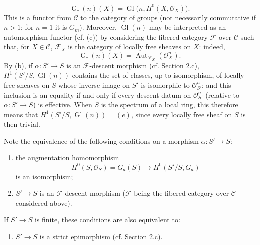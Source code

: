 \[
  \operatorname{Gl}(n)(X)=
  \operatorname{Gl}\bigl(n,H^0(X,\mathcal O_X)\bigr).
\]
This is a functor from $\mathcal C$ to the category of groups (not necessarily
commutative if $n>1$; for $n=1$ it is $G_m$). Moreover,
$\operatorname{Gl}(n)$ may be interpreted as an automorphism functor (cf. (c))
by considering the fibered category $\mathcal F$ over $\mathcal C$ such that,
for $X\in\mathcal C$, $\mathcal F_X$ is the category of locally free sheaves on
$X$: indeed,
\[
  \operatorname{Gl}(n)(X)=
  \operatorname{Aut}_{\mathcal F_X}(\mathcal O_X^n).
\]
By (b), if $\alpha:S'\longrightarrow S$ is an
$\mathcal F$-descent morphism (cf. Section 2.c),
$H^1(S'/S,\operatorname{Gl}(n))$ contains the set of classes, up to
isomorphism, of locally free sheaves on $S$ whose inverse image on $S'$ is
isomorphic to $\mathcal O_{S'}^n$; and this inclusion is an equality if and
only if every descent datum on $\mathcal O_{S'}^n$ (relative to
$\alpha:S'\longrightarrow S$) is effective. When $S$ is the spectrum of a
local ring, this therefore means that
$H^1(S'/S,\operatorname{Gl}(n))=(e)$, since every locally free sheaf on $S$ is
then trivial.

Note the equivalence of the following conditions on a morphism
$\alpha:S'\longrightarrow S$:
\begin{enumerate}
\item[(i)] the augmentation homomorphism
\[
  H^0(S,\mathcal O_S)=G_a(S)\longrightarrow H^0(S'/S,G_a)
\]
is an isomorphism;
\item[(ii)] $S'\longrightarrow S$ is an $\mathcal F$-descent morphism
($\mathcal F$ being the fibered category over $\mathcal C$ considered above).
\end{enumerate}
If $S'\longrightarrow S$ is finite, these conditions are also equivalent to:
\begin{enumerate}
\item[(iii)] $S'\longrightarrow S$ is a strict epimorphism
(cf. Section 2.c).
\end{enumerate}

